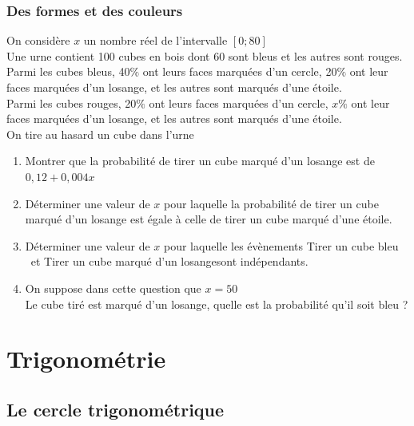 \documentclass[oneside,12pt]{book}          %
\begin{document}
\subsection{Des formes et des couleurs}
 On considère $x$ un nombre réel de l'intervalle $[0;80]$ \\
Une urne contient 100 cubes en bois dont 60 sont bleus et les autres sont rouges. \\
Parmi les cubes bleus, 40$\%$ ont leurs faces marquées d'un cercle, 20$\%$ ont leur faces marquées d'un losange, et les autres sont marqués d'une étoile. \\
Parmi les cubes rouges, 20$\%$ ont leurs faces marquées d'un cercle, $x\%$ ont leur faces marquées d'un losange, et les autres sont marqués d'une étoile.\\
On tire au hasard un cube dans l'urne
\begin{enumerate}
    \item Montrer que la probabilité de tirer un cube marqué d'un losange est de $0,12 + 0,004x$
    \item Déterminer une valeur de $x$ pour laquelle la probabilité de tirer un cube marqué d'un losange est égale à celle de tirer un cube marqué d'une étoile.
    \item Déterminer une valeur de $x$ pour laquelle les évènements \og Tirer un cube bleu \fg ~et \og Tirer un cube marqué d'un losange\fg sont indépendants.
    \item On suppose dans cette question que $x=50$ \\
    Le cube tiré est marqué d'un losange, quelle est la probabilité qu'il soit bleu ?
\end{enumerate}



\chapter{Trigonométrie}
\newpage

\section{Le cercle trigonométrique}
\end{document}
